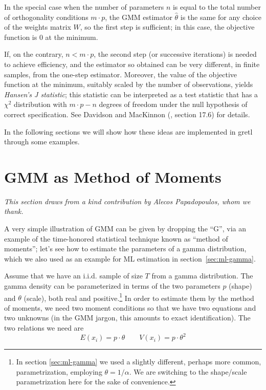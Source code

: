 In the special case when the number of parameters $n$ is equal to the
total number of orthogonality conditions $m \cdot p$, the GMM
estimator $\hat{\theta}$ is the same for any choice of the weights
matrix $W$, so the first step is sufficient; in this case, the
objective function is 0 at the minimum. 

If, on the contrary, $n < m \cdot p$, the second step (or successive
iterations) is needed to achieve efficiency, and the estimator so
obtained can be very different, in finite samples, from the one-step
estimator. Moreover, the value of the objective function at the
minimum, suitably scaled by the number of observations, yields
\emph{Hansen's J statistic}; this statistic can be interpreted as a
test statistic that has a $\chi^2$ distribution with $m \cdot p -n $
degrees of freedom under the null hypothesis of correct specification.
See Davidson and MacKinnon (\citeyear{davidson-mackinnon93}, section
17.6) for details.

In the following sections we will show how these ideas are
implemented in gretl through some examples.

\section{GMM as Method of Moments}
\label{sec:gmm-as-mom}

\emph{This section draws from a kind contribution by Alecos
  Papadopoulos, whom we thank.}

A very simple illustration of GMM can be given by dropping the ``G'',
via an example of the time-honored statistical technique known as
``method of moments''; let's see how to estimate the parameters of a
gamma distribution, which we also used as an example for ML estimation
in section~\ref{sec:ml-gamma}.

Assume that we have an i.i.d. sample of size $T$ from a gamma
distribution. The gamma density can be parameterized in terms of the
two parameters $p$ (shape) and $\theta$ (scale), both real and
positive.\footnote{In section \ref{sec:ml-gamma} we used a slightly
  different, perhaps more common, parametrization, employing
  $\theta = 1/\alpha$. We are switching to the shape/scale
  parametrization here for the sake of convenience.}  In order to
estimate them by the method of moments, we need two moment conditions
so that we have two equations and two unknowns (in the GMM jargon,
this amounts to exact identification). The two relations we need are
\[
  E(x_i) = p \cdot \theta \qquad V(x_i) = p \cdot \theta^2
\]

